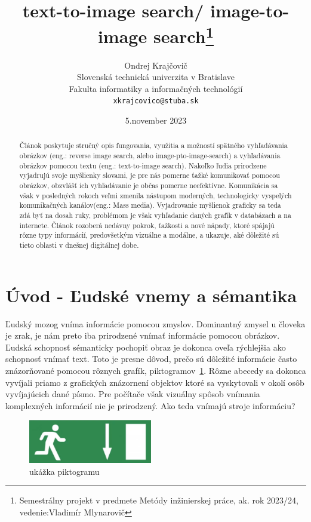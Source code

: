 \documentclass[10pt,twoside,slovak,a4paper]{article}
\title{text-to-image search/ image-to-image search\thanks{Semestrálny projekt v predmete Metódy inžinierskej práce, ak. rok 2023/24, vedenie:Vladimír Mlynarovič}}
\author{Ondrej Krajčovič\\[2pt]
	{\small Slovenská technická univerzita v Bratislave}\\
	{\small Fakulta informatiky a informačných technológií}\\
	{\small \texttt{xkrajcovico@stuba.sk}}
	}
\date{\small 5.november 2023}
\begin{document}
\maketitle

\begin{abstract}
Článok poskytuje stručný opis fungovania, využitia a možností spätného vyhľadávania obrázkov (eng.: reverse image search, alebo image-pto-image-search)
a vyhľadávania obrázkov pomocou textu (eng.: text-to-image search).
Nakoľko ľudia prirodzene vyjadrujú svoje myšlienky slovami, je pre nás pomerne ťažké komunikovať pomocou obrázkov, obzvlášť ich vyhľadávanie je občas pomerne neefektívne. 
Komunikácia sa však v posledných rokoch veľmi zmenila nástupom moderných, technologicky vyspelých komunikačných kanálov(eng.: Mass media). Vyjadrovanie myšlienok graficky sa teda zdá byť na dosah ruky, problémom je však vyhľadanie daných grafík v databázach a na internete. Článok rozoberá nedávny pokrok, ťažkosti a nové nápady, ktoré spájajú rôzne typy informácií, predovšetkým vizuálne a modálne, a ukazuje, aké dôležité sú tieto oblasti v dnešnej digitálnej dobe.

\end{abstract}
\newpage






\section{Úvod - Ľudské vnemy a sémantika} \label{01}
Ľudský mozog vníma informácie pomocou zmyslov. Dominantný zmysel u človeka je zrak, je nám preto iba prirodzené vnímať informácie pomocou obrázkov. Ľudská schopnosť sémanticky pochopiť obraz je dokonca oveľa rýchlejšia ako schopnosť vnímať text. Toto je presne dôvod, prečo sú dôležité informácie často znázorňované pomocou rôznych grafík, piktogramov~\ref{piktogram}. Rôzne abecedy sa dokonca vyvíjali priamo z grafických znázornení objektov ktoré sa vyskytovali v okolí osôb vyvíjajúcich dané písmo.
Pre počítače však vizuálny spôsob vnímania komplexných informácií nie je prirodzený. Ako teda vnímajú stroje informáciu? 
\begin{figure}[htb!]\label{piktogram}
  \centering
  \includegraphics[width=0.48\textwidth]{images/piktogram.png} 
  \caption{ukážka piktogramu}
\end{figure}
\end{document}

